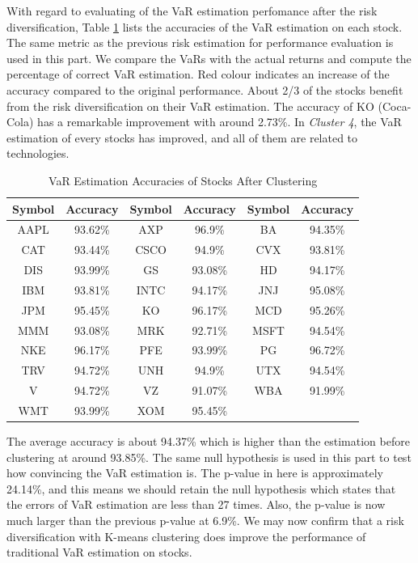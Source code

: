 \documentclass[11pt]{article} %
\theoremstyle{plain}
\theoremstyle{definition}
\begin{document}
With regard to evaluating of the VaR estimation perfomance after the risk diversification, Table \ref{table:accstockafter} lists the accuracies of the VaR estimation on each stock. The same metric as the previous risk estimation for performance evaluation is used in this part. We compare the VaRs with the actual returns and compute the percentage of correct VaR estimation. Red colour indicates an increase of the accuracy compared to the original performance. About 2/3 of the stocks benefit from the risk diversification on their VaR estimation. The accuracy of KO (Coca-Cola) has a remarkable improvement with around 2.73\%. In \textsl{Cluster 4}, the VaR estimation of every stocks has improved, and all of them are related to technologies.

{
  \begin{table}[ht]
    \centering
    \small
    \begin{tabular}{|c|c|c|c|c|c|}
        \hline
        Symbol & Accuracy & Symbol & Accuracy & Symbol & Accuracy \\
        \hline
        AAPL & \color{red}93.62\% & AXP & \color{red}96.9\% & BA & \color{red}94.35\% \\
        CAT & 93.44\% & CSCO & \color{red}94.9\% & CVX & 93.81\% \\
        DIS & \color{red}93.99\% & GS & 93.08\% & HD & \color{red}94.17\% \\
        IBM & 93.81\% & INTC & \color{red}94.17\% & JNJ & \color{red}95.08\% \\
        JPM & \color{red}95.45\% & KO & \color{red}96.17\% & MCD & \color{red}95.26\% \\
        MMM & 93.08\% & MRK & 92.71\% & MSFT & \color{red}94.54\% \\
        NKE & \color{red}96.17\% & PFE & 93.99\% & PG & \color{red}96.72\% \\
        TRV & \color{red}94.72\% & UNH & \color{red}94.9\% & UTX & \color{red}94.54\% \\
        V & \color{red}94.72\% & VZ & 91.07\% & WBA & 91.99\% \\
        WMT & 93.99\% & XOM & \color{red}95.45\% & & \\
        \hline
    \end{tabular}
    \caption{VaR Estimation Accuracies of Stocks After Clustering}
    \label{table:accstockafter}
  \end{table}
}

The average accuracy is about 94.37\% which is higher than the estimation before clustering at around 93.85\%. The same null hypothesis is used in this part to test how convincing the VaR estimation is. The p-value in here is approximately 24.14\%, and this means we should retain the null hypothesis which states that the errors of VaR estimation are less than 27 times. Also, the p-value is now much larger than the previous p-value at 6.9\%. We may now confirm that a risk diversification with K-means clustering does improve the performance of traditional VaR estimation on stocks.
\end{document}
